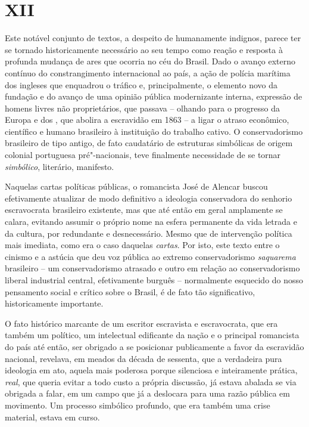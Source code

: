 \section{XII}

Este notável conjunto de textos, a despeito de humanamente indignos,
parece ter se tornado historicamente necessário ao seu tempo como reação
e resposta à profunda mudança de ares que ocorria no céu do Brasil. Dado
o avanço externo contínuo do constrangimento internacional ao país, a
ação de polícia marítima dos ingleses que enquadrou o tráfico e,
principalmente, o elemento novo da fundação e do avanço de uma opinião
pública modernizante interna, expressão de homens livres não
proprietários, que passava -- olhando para o progresso da Europa e dos
, que abolira a escravidão em 1863 -- a ligar o atraso econômico,
científico e humano brasileiro à instituição do trabalho cativo. O
conservadorismo brasileiro de tipo antigo, de fato caudatário de
estruturas simbólicas de origem colonial portuguesa pré"-nacionais, teve
finalmente necessidade de se tornar \emph{simbólico}, literário,
manifesto.

Naquelas cartas políticas públicas, o romancista José de Alencar buscou
efetivamente atualizar de modo definitivo a ideologia conservadora do
senhorio escravocrata brasileiro existente, mas que até então em geral
amplamente se calara, evitando assumir o próprio nome na esfera
permanente da vida letrada e da cultura, por redundante e desnecessário.
Mesmo que de intervenção política mais imediata, como era o caso
daquelas \emph{cartas}. Por isto, este texto entre o cinismo e a astúcia
que deu voz pública ao extremo conservadorismo \emph{saquarema}
brasileiro -- um conservadorismo atrasado e outro em relação ao
conservadorismo liberal industrial central, efetivamente burguês --
normalmente esquecido do nosso pensamento social e crítico sobre o
Brasil, é de fato tão significativo, historicamente importante.

O fato histórico marcante de um escritor escravista e escravocrata, que
era também um político, um intelectual edificante da nação e o principal
romancista do país até então, ser obrigado a se posicionar publicamente
a favor da escravidão nacional, revelava, em meados da década de
sessenta, que a verdadeira pura ideologia em ato, aquela mais poderosa
porque silenciosa e inteiramente prática, \emph{real}, que queria evitar
a todo custo a própria discussão, já estava abalada se via obrigada a
falar, em um campo que já a deslocara para uma razão pública em
movimento. Um processo simbólico profundo, que era também uma crise
material, estava em curso.


